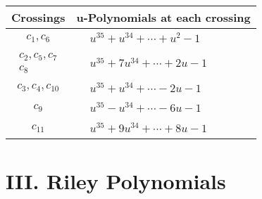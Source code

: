 \documentclass[1p]{elsarticle_modified}
\theoremstyle{definition}
\begin{document}
\begin{tabular}{m{50pt}|m{274pt}}
Crossings & \hspace{64pt}u-Polynomials at each crossing \\
\hline $$\begin{aligned}c_{1},c_{6}\end{aligned}$$&$\begin{aligned}
&u^{35}+u^{34}+\cdots+u^2-1
\end{aligned}$\\
\hline $$\begin{aligned}c_{2},c_{5},c_{7}\\c_{8}\end{aligned}$$&$\begin{aligned}
&u^{35}+7 u^{34}+\cdots+2 u-1
\end{aligned}$\\
\hline $$\begin{aligned}c_{3},c_{4},c_{10}\end{aligned}$$&$\begin{aligned}
&u^{35}+u^{34}+\cdots-2 u-1
\end{aligned}$\\
\hline $$\begin{aligned}c_{9}\end{aligned}$$&$\begin{aligned}
&u^{35}- u^{34}+\cdots-6 u-1
\end{aligned}$\\
\hline $$\begin{aligned}c_{11}\end{aligned}$$&$\begin{aligned}
&u^{35}+9 u^{34}+\cdots+8 u-1
\end{aligned}$\\
\hline
\end{tabular}\newpage\renewcommand{\arraystretch}{1}
\centering \section*{ III. Riley Polynomials}
\end{document}
